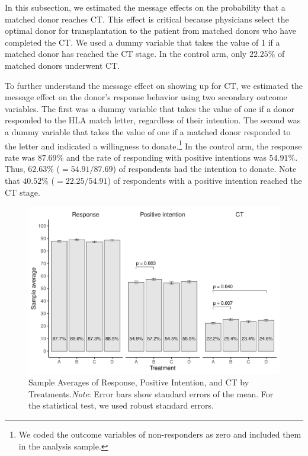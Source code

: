 \documentclass [12pt, a4paper]{article}
\begin{document}
In this subsection, we estimated the message effects on the probability that a matched donor reaches CT. This effect is critical  because physicians select the optimal donor for transplantation to the patient from matched donors who have completed the CT. We used a dummy variable that takes the value of 1 if a matched donor has reached the CT stage. In the control arm, only \(22.25\)\% of matched donors underwent CT.

To further understand the message effect on showing up for CT, we estimated the message effect on the donor's response behavior using two secondary outcome variables. The first was a dummy variable that takes the value of one if a donor responded to the HLA match letter, regardless of their intention. The second was a dummy variable that takes the value of one if a matched donor responded to the letter and indicated a willingness to donate.\footnote{We coded the outcome variables of non-responders as zero and included them in the analysis sample.} In the control arm, the response rate was \(87.69\)\% and the rate of responding with positive intentions was \(54.91\)\%. Thus, \(62.63\)\% (\(=54.91/87.69\)) of respondents had the intention to donate. Note that \(40.52\)\% (\(=22.25/54.91\)) of respondents with a positive intention reached the CT stage.

\begin{figure}[t]
\includegraphics{JMDP RCT - Main Document_files/figure-latex/stock-diff-mean-1} \caption{Sample Averages of Response, Positive Intention, and CT by Treatments.\newline \emph{Note}: Error bars show standard errors of the mean. For the statistical test, we used robust standard errors.}\label{fig:stock-diff-mean}
\end{figure}
\end{document}
